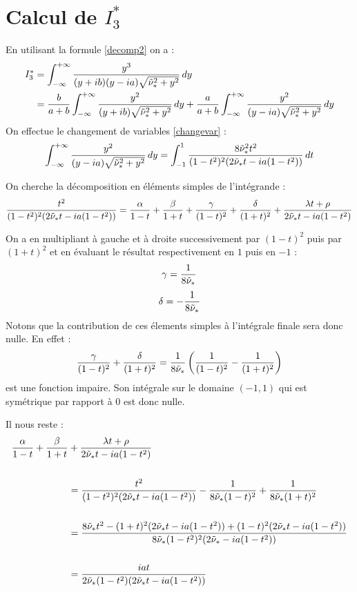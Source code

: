 \section{Calcul de $I_3^*$}
\label{calcI3}
En utilisant la formule \eqref{decomp2} on a :
\begin{equation*}
\begin{split}
I_3^*&=\int_{-\infty}^{+\infty} \frac{y^3}{(y+ib)(y-ia)\sqrt{\tilde{\nu}_*^2+y^2}} \,dy \\
&=\frac{b}{a+b}\int_{-\infty}^{+\infty} \frac{y^2}{(y+ib)\sqrt{\tilde{\nu}_*^2+y^2}} \, dy +\frac{a}{a+b}\int_{-\infty}^{+\infty} \frac{y^2}{(y-ia)\sqrt{\tilde{\nu}_*^2+y^2}} \, dy
\end{split}
\end{equation*}
On effectue le changement de variables \eqref{changevar} :
\begin{equation}
 \int_{-\infty}^{+\infty} \frac{y^2}{(y-ia)\sqrt{\tilde{\nu}_*^2+y^2}} \,dy = \int_{-1}^1 \frac{8\tilde{\nu}_*^2t^2}{(1-t^2)^2(2\tilde{\nu}_* t -ia(1-t^2))} \, dt
\end{equation}

On cherche la décomposition en éléments simples de l'intégrande :
\begin{equation*}
\frac{t^2}{(1-t^2)^2(2\tilde{\nu}_* t -ia(1-t^2))}=\frac{\alpha}{1-t}+\frac{\beta}{1+t}+ \frac{\gamma}{(1-t)^2}+\frac{\delta}{(1+t)^2} +\frac{\lambda t + \rho }{2\tilde{\nu}_* t-ia(1-t^2)}
\end{equation*}

On a en multipliant à gauche et à droite successivement par $(1-t)^2$ puis par $(1+t)^2$ et en évaluant le résultat respectivement en $1$ puis en $-1$ :
$$ \gamma=\frac{1}{8\tilde{\nu}_*} $$
$$\delta = -\frac{1}{8\tilde{\nu}_*} $$
Notons que la contribution de ces élements simples à l'intégrale finale sera donc nulle. En effet :
$$ \frac{\gamma}{(1-t)^2}+\frac{\delta}{(1+t)^2}=\frac{1}{8\tilde{\nu}_*}\left( \frac{1}{(1-t)^2}-\frac{1}{(1+t)^2}\right) $$
est une fonction impaire. Son intégrale sur le domaine $ (-1,1)$ qui est symétrique par rapport à 0 est donc nulle.

Il nous reste :
\begin{equation*}
\begin{split}
\frac{\alpha}{1-t}+\frac{\beta}{1+t}&+ \frac{\lambda t + \rho }{2\tilde{\nu}_* t-ia(1-t^2)}\\  
~\\
&=\frac{t^2}{(1-t^2)^2(2\tilde{\nu}_* t -ia(1-t^2))}-\frac{1}{8\tilde{\nu}_*(1-t)^2}+\frac{1}{8\tilde{\nu}_*(1+t)^2}  \\
~\\
&=\frac{8\tilde{\nu}_*t^2-(1+t)^2(2\tilde{\nu}_*t-ia(1-t^2))+(1-t)^2(2\tilde{\nu}_*t-ia(1-t^2))}{8\tilde{\nu}_*(1-t^2)^2(2\tilde{\nu}_*-ia(1-t^2))}\\
~\\
&=\frac{iat}{2\tilde{\nu}_*(1-t^2)(2\tilde{\nu}_*t-ia(1-t^2))}
\end{split}
\end{equation*}

